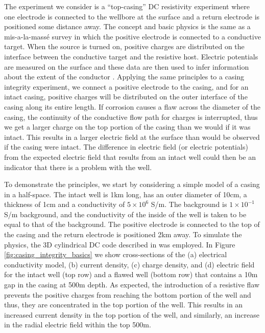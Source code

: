 The experiment we consider is a ``top-casing'' DC resistivity experiment where one electrode is connected to the wellbore at the surface and a return electrode is positioned some distance away. The concept and basic physics is the same as a mis-a-la-mass\'e survey in which the positive electrode is connected to a conductive target. When the source is turned on, positive charges are distributed on the interface between the conductive target and the resistive host. Electric potentials are measured on the surface and these data are then used to infer information about the extent of the conductor \citep{Telford1990}. Applying the same principles to a casing integrity experiment, we connect a positive electrode to the casing, and for an intact casing, positive charges will be distributed on the outer interface of the casing along its entire length. If corrosion causes a flaw across the diameter of the casing, the continuity of the conductive flow path for charges is interrupted, thus we get a larger charge on the top portion of the casing than we would if it was intact. This results in a larger electric field at the surface than would be observed if the casing were intact. The difference in electric field (or electric potentials) from the expected electric field that results from an intact well could then be an indicator that there is a problem with the well.

To demonstrate the principles, we start by considering a simple model of a casing in a half-space. The intact well is 1km long, has an outer diameter of 10cm, a thickness of 1cm and a conductivity of $5\times10^6$ S/m. The background is $1 \times 10^{-1}$ S/m background, and the conductivity of the inside of the well is taken to be equal to that of the background. The positive electrode is connected to the top of the casing and the return electrode is positioned 2km away. To simulate the physics, the 3D cylindrical DC code described in \cite{Heagy2018} was employed. In Figure \ref{fig:casing_integrity_basics} we show cross-sections of the (a) electrical conductivity model, (b) current density, (c) charge density, and (d) electric field for the intact well (top row)  and a flawed well (bottom row) that contains a 10m gap in the casing at 500m depth. As expected, the introduction of a resistive flaw prevents the positive charges from reaching the bottom portion of the well and thus, they are concentrated in the top portion of the well. This results in an increased current density in the top portion of the well, and similarly, an increase in the radial electric field within the top 500m.

